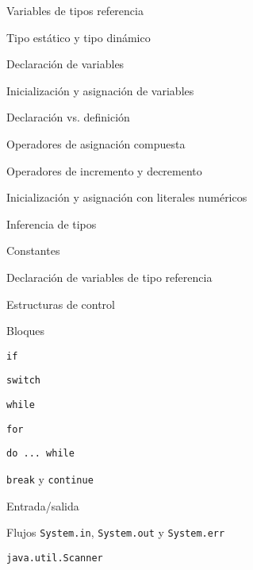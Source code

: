 \begin{longenum}
\begin{longenum}
\begin{longenum}
            \item Variables de tipos referencia
            \begin{longenum}
                \item Tipo estático y tipo dinámico
            \end{longenum}
            \item Declaración de variables
            \begin{longenum}
                \item Inicialización y asignación de variables
                \begin{longenum}
                    \item Declaración vs. definición
                    \item Operadores de asignación compuesta
                    \item Operadores de incremento y decremento
                    \item Inicialización y asignación con literales numéricos
                \end{longenum}
                \item Inferencia de tipos
                \item Constantes
                \item Declaración de variables de tipo referencia
            \end{longenum}
        \end{longenum}
        \item Estructuras de control
        \begin{longenum}
            \item Bloques
            \item \texttt{if}
            \item \texttt{switch}
            \item \texttt{while}
            \item \texttt{for}
            \item \texttt{do ... while}
            \item \texttt{break} y \texttt{continue}
        \end{longenum}
        \item Entrada/salida
        \begin{longenum}
            \item Flujos \texttt{System.in}, \texttt{System.out} y \texttt{System.err}
            \item \texttt{java.util.Scanner}

\end{longenum}
\end{longenum}
\end{longenum}
